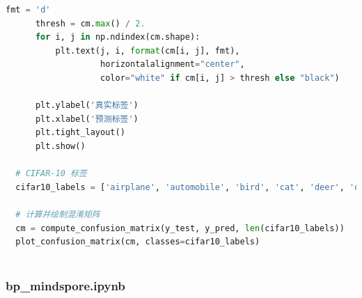 \documentclass[12pt]{article}
\begin{document}
\begin{lstlisting}[language=Python]
      fmt = 'd'
      thresh = cm.max() / 2.
      for i, j in np.ndindex(cm.shape):
          plt.text(j, i, format(cm[i, j], fmt),
                   horizontalalignment="center",
                   color="white" if cm[i, j] > thresh else "black")
  
      plt.ylabel('真实标签')
      plt.xlabel('预测标签')
      plt.tight_layout()
      plt.show()
  
  # CIFAR-10 标签
  cifar10_labels = ['airplane', 'automobile', 'bird', 'cat', 'deer', 'dog', 'frog', 'horse', 'ship', 'truck']
  
  # 计算并绘制混淆矩阵
  cm = compute_confusion_matrix(y_test, y_pred, len(cifar10_labels))
  plot_confusion_matrix(cm, classes=cifar10_labels)
  
\end{lstlisting}
\subsubsection{bp\_mindspore.ipynb}
\end{document}
